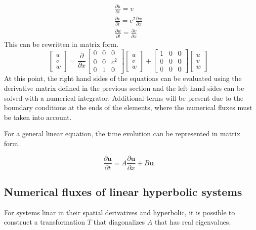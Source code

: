 \documentclass{article}
\begin{document}
\begin{eqnarray}
\frac{\partial u}{\partial t}=v\\
\frac{\partial v}{\partial t}=c^2\frac{\partial w}{\partial x}\\
\frac{\partial w}{\partial t}=\frac{\partial v}{\partial x}
\end{eqnarray}
This can be rewritten in matrix form.
\[
\begin{bmatrix}
u\\
v\\
w
\end{bmatrix}
=
\frac{\partial}{\partial x}
\begin{bmatrix}
0 & 0 &0\\
0 & 0 &c^2\\
0 & 1 & 0 
\end{bmatrix}
\begin{bmatrix}
u\\
v\\
w
\end{bmatrix}
+
\begin{bmatrix}
1 & 0 & 0\\
0 & 0 & 0\\
0 & 0 & 0
\end{bmatrix}
\begin{bmatrix}
u\\
v\\
w
\end{bmatrix}
\]
At this point, the right hand sides of the equations can be evaluated
using the derivative matrix defined in the previous section and the
left hand sides can be solved with a numerical integrator. Additional
terms will be present due to the boundary conditions at the ends of
the elements, where the numerical fluxes must be taken into account.

For a general linear equation, the time evolution can be represented in matrix form. 

\begin{equation}
\frac{\partial \boldsymbol{u}}{\partial t}= A\frac{\partial
  \boldsymbol{u}}{\partial x} +B\boldsymbol{u}
\label{generalseparated}
\end{equation}

\subsection{Numerical fluxes of linear hyperbolic systems}

For systems linar in their spatial derivatives and hyperbolic, it is possible to construct a transformation $T$
that diagonalizes $A$ that has real eigenvalues.
\end{document}

